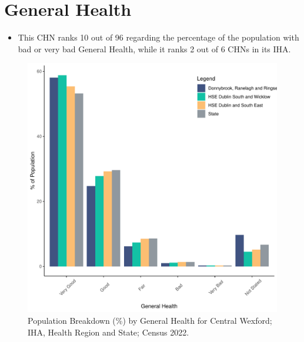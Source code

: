 \documentclass{article}
\begin{document}
\pagebreak

\section{General Health}\label{sect:GenHealth}
\begin{itemize}
\item  This CHN ranks  10 out of 96 regarding the percentage of the population with bad or very bad General Health, while it ranks   2 out of 6 CHNs in its IHA.
\end{itemize}
\begin{figure}[h]
	\centering
	\includegraphics[width = 150mm]{../figures/GenED.pdf}
	\caption{Population Breakdown (\%) by General Health for Central Wexford; IHA, Health Region and State;  Census 2022.}
	\label{fig:2ae19629-1a6a-13a3-e055-000000000001}
	\end{figure}
\end{document}

